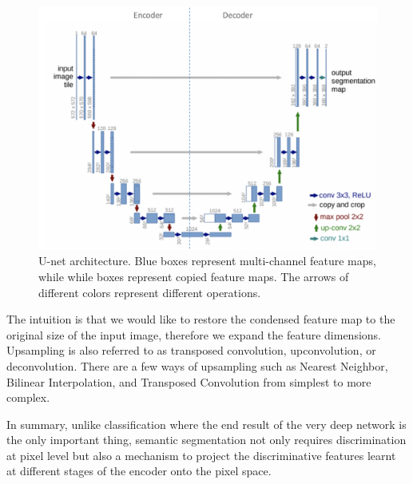 \begin{figure}[!h]
\begin{center}
\includegraphics[width=.7\linewidth]{images/unet.png}
\caption {U-net architecture. Blue boxes represent multi-channel feature maps, while while boxes represent copied feature maps. The arrows of different colors represent different operations.} 
\label{fig:unet}
\end{center}
\end{figure}

The intuition is that we would like to restore the condensed feature map to the original size of the input image, therefore we expand the feature dimensions. Upsampling is also referred to as transposed convolution, upconvolution, or deconvolution. There are a few ways of upsampling such as Nearest Neighbor, Bilinear Interpolation, and Transposed Convolution from simplest to more complex.

In summary, unlike classification where the end result of the very deep network is the only important thing, semantic segmentation not only requires discrimination at pixel level but also a mechanism to project the discriminative features learnt at different stages of the encoder onto the pixel space.